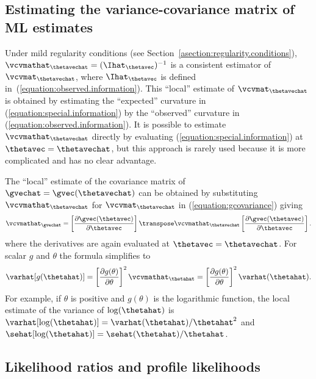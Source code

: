 \subsection{Estimating the variance-covariance 
matrix of ML estimates}
\label{asection:observed.information}
Under mild
regularity conditions (see
Section~\ref{asection:regularity.conditions}),
$\vcvmathat_{\thetavechat}=(\Ihat_{\thetavec})^{-1}$
is a consistent estimator of
$\vcvmat_{\thetavechat}$,
where 
$\Ihat_{\thetavec}$ is
defined in~(\ref{equation:observed.information}).
This ``local'' estimate of $\vcvmat_{\thetavechat}$
is obtained by estimating the ``expected''
curvature in (\ref{equation:special.information}) by the ``observed''
curvature in (\ref{equation:observed.information}).  It is possible to
estimate $\vcvmathat_{\thetavechat}$ directly by evaluating 
(\ref{equation:special.information}) at $\thetavec=\thetavechat$,
but this approach is rarely used because it is more complicated and
has no clear advantage.

The ``local''
estimate of the covariance matrix of $\gvechat=\gvec(\thetavechat)$
can be obtained by substituting $\vcvmathat_{\thetavechat}$ for
$\vcvmat_{\thetavechat}$ in (\ref{equation:gcovariance}) giving
\begin{equation} 
\label{equation:gcovariance.est}
 \vcvmathat_{\gvechat}=
\left [\frac{\partial \gvec(\thetavec)}{\partial \thetavec }
 \right ] \transpose
 \vcvmathat_{\thetavechat}
\left [\frac{\partial \gvec(\thetavec)}{\partial \thetavec } \right ].
\end{equation}
where the derivatives are again evaluated at
$\thetavec=\thetavechat$.  For scalar $g$ and $\theta$ the formula
simplifies to
\begin{displaymath}
\varhat[g(\thetahat)]
=\left [\frac{\partial g(\theta)}{\partial \theta}
 \right ] ^{2}
 \vcvmathat_{\thetahat} =\left [\frac{\partial g(\theta)}{\partial \theta}
 \right ] ^{2}
 \varhat(\thetahat).
\end{displaymath}
For example, if $\theta$ is positive and $g(\theta)$ is the
{\rm logarithmic} function, the local estimate of the variance of
$\log(\thetahat)$ is
$\varhat[\log(\thetahat)]=\varhat(\thetahat)/\thetahat^{2}$
and $\sehat[\log(\thetahat)]=\sehat(\thetahat)/\thetahat$.


\subsection{Likelihood ratios and profile likelihoods}
\label{section:profile.on.theta}


